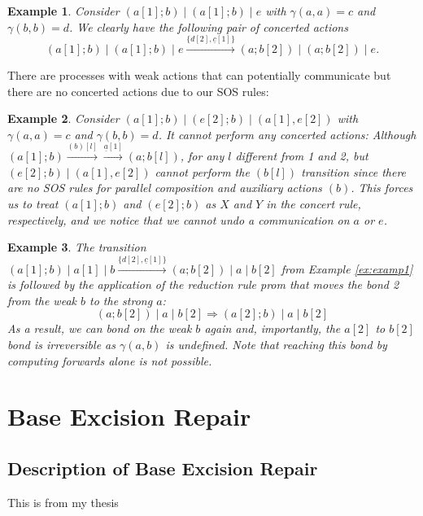 \documentclass[review]{elsarticle}
\newcommand{\paral}{\; \vert \;}
\newtheorem{example}{Example}
\begin{document}
\begin{example}\label{ex:examp2}
Consider $(a[1];b)\paral (a[1];b)\paral e$ with $\gamma(a,a)=c$ and $\gamma(b,b)=d$. 
We clearly have the following pair of concerted actions
 $$(a[1];b)\paral (a[1];b)\paral e  \xrightarrow{\{d[2], \underline{c}[1]\}} 
(a;b[2])\paral (a;b[2])\paral e. $$
\end{example}

There are processes with weak actions that can potentially communicate but there are no concerted actions
due to our SOS rules:

\begin{example}\label{ex:examp3}
Consider $(a[1];b)\paral (e[2];b)\paral (a[1],e[2])$ with $\gamma(a,a)=c$ and $\gamma(b,b)=d$.
It cannot perform any concerted actions: Although $(a[1];b)  \xrightarrow{(b)[l]} 
\xrightarrow{\underline{a}[1]} (a;b[l])$, for any $l$ different from 1 and 2, but 
$(e[2];b)\paral (a[1],e[2])$  cannot perform the $(b[l])$
transition since there are no SOS rules for parallel composition and auxiliary actions $(b)$. This forces us
to treat $(a[1];b)$ and $ (e[2];b)$ as $X$ and $Y$ in the concert rule, respectively, and we notice that
we cannot undo a communication on $a$ or $e$.
\end{example}


\begin{example}\label{example4}
The transition 
$(a[1];b) \paral a[1] \paral  b \xrightarrow{\{d[2], \underline{c}[1]\}} (a;b[2])\paral a \paral b[2]$ 
from Example \ref{ex:examp1} is followed by the application of the reduction rule prom that moves the bond 2
from the weak $b$ to the strong $a$:
$$(a;b[2])\paral a \paral b[2] \Rightarrow (a[2];b)\paral a \paral b[2] $$
As a result, we can bond on the weak $b$ again and, importantly, the $a[2]$ to $b[2]$ bond is irreversible
as $\gamma(a,b)$ is undefined. Note that reaching
this bond by computing forwards alone is not possible.
\end{example}

\section{Base Excision Repair}
\label{sec:ber}

\subsection{Description of Base Excision Repair}

This is from my thesis
\end{document}
